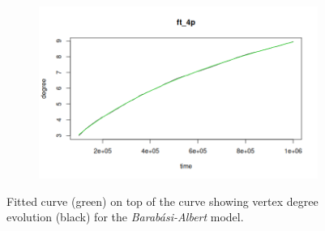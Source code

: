 \begin{figure}[ht]
\begin{subfigure}{.5\textwidth}
\end{subfigure}%
\begin{subfigure}{.5\textwidth}
  \centering
  \includegraphics[width=\linewidth]{figures/scaling_fits/fit_ba_5.png}
\end{subfigure}
\caption{Fitted curve (green) on top of the curve showing vertex degree evolution (black) for the \textit{Barabási-Albert} model.}
\label{fig:fit_BA}
\end{figure}

